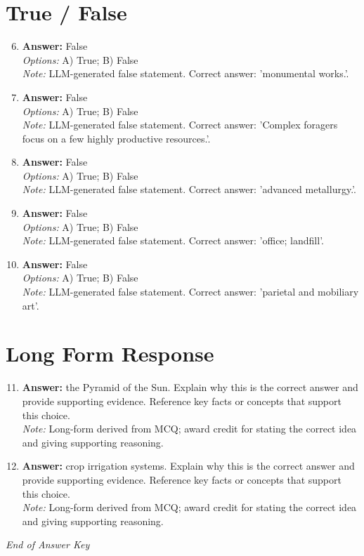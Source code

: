 \documentclass[12pt]{article}
\begin{document}
\section*{True / False}
\begin{enumerate}[label=\arabic*.]
\setcounter{enumi}{5}
\item \textbf{Answer:} False
\\ \textit{Options:} A) True; B) False
\\ \textit{Note:} LLM-generated false statement. Correct answer: 'monumental works.'.
\item \textbf{Answer:} False
\\ \textit{Options:} A) True; B) False
\\ \textit{Note:} LLM-generated false statement. Correct answer: 'Complex foragers focus on a few highly productive resources.'.
\item \textbf{Answer:} False
\\ \textit{Options:} A) True; B) False
\\ \textit{Note:} LLM-generated false statement. Correct answer: 'advanced metallurgy.'.
\item \textbf{Answer:} False
\\ \textit{Options:} A) True; B) False
\\ \textit{Note:} LLM-generated false statement. Correct answer: 'office; landfill'.
\item \textbf{Answer:} False
\\ \textit{Options:} A) True; B) False
\\ \textit{Note:} LLM-generated false statement. Correct answer: 'parietal and mobiliary art'.
\end{enumerate}

\section*{Long Form Response}
\begin{enumerate}[label=\arabic*.]
\setcounter{enumi}{10}
\item \textbf{Answer:} the Pyramid of the Sun. Explain why this is the correct answer and provide supporting
evidence. Reference key facts or concepts that support this choice.
\\ \textit{Note:} Long-form derived from MCQ; award credit for stating the correct idea and giving supporting reasoning.
\item \textbf{Answer:} crop irrigation systems. Explain why this is the correct answer and provide supporting
evidence. Reference key facts or concepts that support this choice.
\\ \textit{Note:} Long-form derived from MCQ; award credit for stating the correct idea and giving supporting reasoning.
\end{enumerate}

\vfill
\noindent\textit{End of Answer Key}
\end{document}
